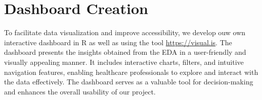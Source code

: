\section{{\bf{Dashboard Creation}}}
To facilitate data visualization and improve accessibility, we develop ouw own interactive dashboard in R as well as using the tool \url{https://visual.is}. The dashboard presents the insights obtained from the EDA in a user-friendly and visually appealing manner. It includes interactive charts, filters, and intuitive navigation features, enabling healthcare professionals to explore and interact with the data effectively. The dashboard serves as a valuable tool for decision-making and enhances the overall usability of our project.


